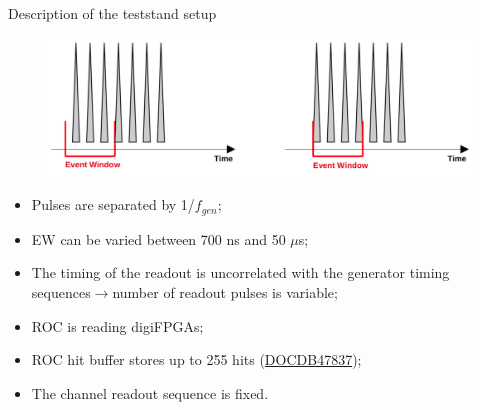 \documentclass{beamer}[10pt]
\begin{document}
\begin{frame}{Description of the teststand setup}
 \begin{figure}[H]
   \centering
   \includegraphics[width= 1.0\textwidth]{figures/png/Screenshot_20240308_165327.png}
   \label{fig:djn}
 \end{figure}
\begin{itemize}
\item Pulses are separated by 1/$f_{gen}$;
\item EW can be varied between 700 ns and 50 $\mu$s;
\item The timing of the readout is uncorrelated with the generator timing sequences$\rightarrow$number of readout pulses is variable;
\item ROC is reading digiFPGAs;
\item ROC hit buffer stores up to 255 hits (\href{https://mu2e-docdb.fnal.gov/cgi-bin/sso/RetrieveFile?docid=47837&filename=mu2e-47837.pdf&version=1}{DOCDB47837});
\item The channel readout sequence is fixed.
\end{itemize}
\end{frame}
\end{document}
